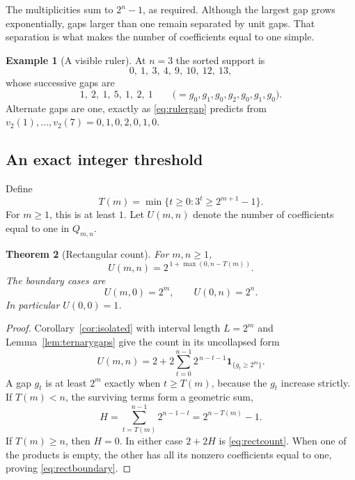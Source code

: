 \documentclass[11pt,letterpaper]{article}
\numberwithin{equation}{section}
\newtheorem{theorem}{Theorem}[section]
\theoremstyle{definition}
\newtheorem{example}[theorem]{Example}
\theoremstyle{remark}
\newcommand{\ind}[1]{\boldsymbol{1}_{\{#1\}}}
\begin{document}
The multiplicities sum to $2^n-1$, as required. Although the largest gap
grows exponentially, gaps larger than one remain separated by unit gaps.
That separation is what makes the number of coefficients equal to one simple.

\begin{example}[A visible ruler]\label{ex:ruler}
At $n=3$ the sorted support is
\[
 0,\ 1,\ 3,\ 4,\ 9,\ 10,\ 12,\ 13,
\]
whose successive gaps are
\[
 1,\ 2,\ 1,\ 5,\ 1,\ 2,\ 1
 \qquad\bigl(=g_0,g_1,g_0,g_2,g_0,g_1,g_0\bigr).
\]
Alternate gaps are one, exactly as \eqref{eq:rulergap} predicts from
$v_2(1),\ldots,v_2(7)=0,1,0,2,0,1,0$.
\end{example}

\subsection{An exact integer threshold}
Define
\begin{equation}\label{eq:threshold}
 T(m)=\min\{t\ge0:3^t\ge 2^{m+1}-1\}.
\end{equation}
For $m\ge1$, this is at least $1$. Let $U(m,n)$ denote the number of
coefficients equal to one in $Q_{m,n}$.

\begin{theorem}[Rectangular count]\label{thm:rectangle}
For $m,n\ge1$,
\begin{equation}\label{eq:rectcount}
 U(m,n)=2^{\,1+\max(0,n-T(m))}.
\end{equation}
The boundary cases are
\begin{equation}\label{eq:rectboundary}
 U(m,0)=2^m,\qquad U(0,n)=2^n.
\end{equation}
In particular $U(0,0)=1$.
\end{theorem}
\begin{proof}
Corollary~\ref{cor:isolated} with interval length $L=2^m$ and
Lemma~\ref{lem:ternarygaps} give the count in its uncollapsed form
\begin{equation}\label{eq:Usum}
 U(m,n)=2+2\sum_{t=0}^{n-1}2^{\,n-t-1}\ind{g_t\ge2^m}.
\end{equation}
A gap $g_t$ is at least $2^m$ exactly when $t\ge T(m)$, because the $g_t$
increase strictly. If $T(m)<n$, the surviving terms form a geometric sum,
\[
 H=\sum_{t=T(m)}^{n-1}2^{n-1-t}=2^{n-T(m)}-1.
\]
If $T(m)\ge n$, then $H=0$. In either case $2+2H$ is \eqref{eq:rectcount}.
When one of the products is empty, the other has all its nonzero
coefficients equal to one, proving \eqref{eq:rectboundary}.
\end{proof}
\end{document}
